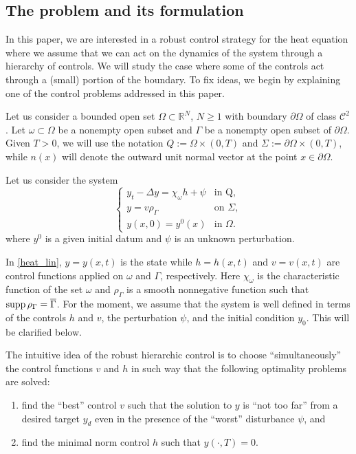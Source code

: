 \documentclass{aims}
\theoremstyle{definition}
\def\cbd{\Gamma}
\newcommand\csin[1]{\chi_{#1}}
\def\csbd{\rho_{\Gamma}}
\def\supp{\textnormal{supp}\,}
\begin{document}
\subsection{The problem and its formulation}

In this paper, we are interested in a robust control strategy for the heat equation where we assume that we can act on the dynamics of the system through a hierarchy of controls. We will study the case where some of the controls act through a (small) portion of the boundary. To fix ideas, we begin by explaining one of the control problems addressed in this paper. 

Let us consider a bounded open set $\Omega\subset \mathbb{R}^N$, $N\geq 1$ with boundary $\partial \Omega$ of class $\mathcal C^2$. Let $\omega\subset \Omega$ be a nonempty open subset and {$\cbd$ be a nonempty open subset of $\partial \Omega$}.  Given $T>0$, we will use the notation $Q:=\Omega\times(0,T)$ and $\Sigma:=\partial \Omega\times(0,T)$, while $n(x)$ will denote the outward unit normal vector at the point $x\in \partial \Omega$. 

Let us consider the system
%
\begin{equation}\label{heat_lin}
\begin{cases}
y_t-\Delta y=\csin{\omega}h+\psi & \text{in Q}, \\
y=v\csbd &\text{on } \Sigma, \\
y(x,0)=y^0(x) & \text{in } \Omega.
\end{cases}
\end{equation}
%
where $y^0$ is a given initial datum and $\psi$ is an unknown perturbation.

In \eqref{heat_lin}, $y=y(x,t)$ is the state while $h=h(x,t)$ and $v=v(x,t)$ are control functions applied on $\omega$ and $\Gamma$, respectively. Here $\csin{\omega}$ is the characteristic function of the set $\omega$ and $\csbd$ is a smooth nonnegative function such that $\supp\csbd=\overline \cbd$. For the moment, we assume that the system is well defined in terms of the controls $h$ and $v$, the perturbation $\psi$, and the initial condition $y_0$. This will be clarified below. 

The intuitive idea of the robust hierarchic control is to choose ``simultaneously'' the control functions  $v$ and $h$ in such way that the following optimality problems are solved: 
%
\begin{enumerate}
\item find the ``best'' control $v$ such that the solution to $y$ is ``not too far'' from a desired target $y_d$ even in the presence of the ``worst'' disturbance $\psi$, and
\item find the minimal norm control $h$ such that $y(\cdot,T)=0$. 
\end{enumerate}
\end{document}
